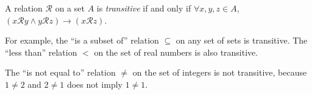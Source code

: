 \documentclass{article}
\begin{document}
A relation $\mathcal{R}$ on a set $A$ is \emph{transitive} if and only if
$\forall x,y,z \in A$, $(x\mathcal{R}y \land y\mathcal{R}z) \rightarrow (x\mathcal{R}z)$.

For example, the ``is a subset of'' relation $\subseteq$
on any set of sets is transitive.
The ``less than'' relation $<$ on the set of real numbers
is also transitive.

The ``is not equal to'' relation $\neq$
on the set of integers is not transitive,
because $1\neq 2$ and $2\neq 1$ does not imply $1\neq 1$.
\end{document}
